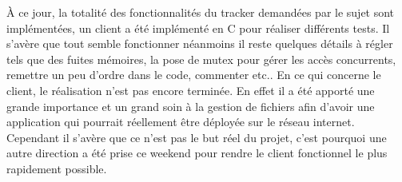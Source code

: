 À ce jour, la totalité des fonctionnalités du tracker demandées par le sujet sont implémentées, un client a été implémenté en C pour réaliser différents tests. Il s'avère que tout semble fonctionner néanmoins il reste quelques détails à régler tels que des fuites mémoires, la pose de mutex pour gérer les accès concurrents, remettre un peu d'ordre dans le code, commenter etc.. 
En ce qui concerne le client, le réalisation n'est pas encore terminée. En effet il a été apporté une grande importance et un grand soin à la gestion de fichiers afin d'avoir une application qui pourrait réellement être déployée sur le réseau internet. Cependant il s'avère que ce n'est pas le but réel du projet, c'est pourquoi une autre direction a été prise ce weekend pour rendre le client fonctionnel le plus rapidement possible. 


